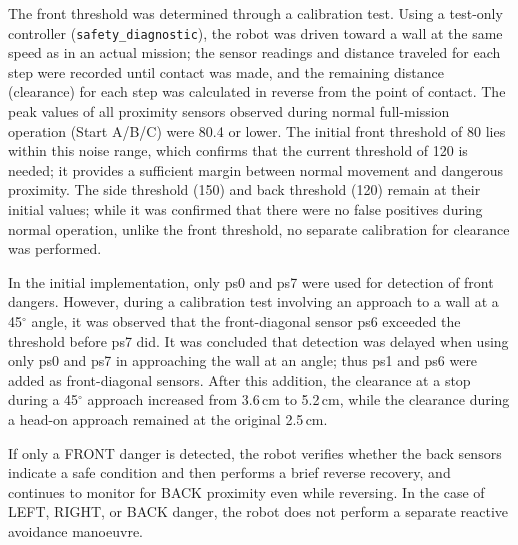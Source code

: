 The front threshold was determined through a calibration test. 
Using a test-only controller (\texttt{safety\_diagnostic}), the robot was driven toward a wall at the same speed as in an actual mission; the sensor readings and distance traveled for each step were recorded until contact was made, and the remaining distance (clearance) for each step was calculated in reverse from the point of contact.
The peak values of all proximity sensors observed during normal full-mission operation (Start A/B/C) were 80.4 or lower. 
The initial front threshold of 80 lies within this noise range, which confirms that the current threshold of 120 is needed; it provides a sufficient margin between normal movement and dangerous proximity. 
The side threshold (150) and back threshold (120) remain at their initial values; while it was confirmed that there were no false positives during normal operation, unlike the front threshold, no separate calibration for clearance was performed. 

In the initial implementation, only ps0 and ps7 were used for detection of front dangers. However, during a calibration test involving an approach to a wall at a 45$^\circ$ angle, it was observed that the front-diagonal sensor ps6 exceeded the threshold before ps7 did. 
It was concluded that detection was delayed when using only ps0 and ps7 in approaching the wall at an angle; thus ps1 and ps6 were added as front-diagonal sensors. 
After this addition, the clearance at a stop during a 45$^\circ$ approach increased from 3.6\,cm to 5.2\,cm, while the clearance during a head-on approach remained at the original 2.5\,cm. 

If only a FRONT danger is detected, the robot verifies whether the back sensors indicate a safe condition and then performs a brief reverse recovery, and continues to monitor for BACK proximity even while reversing. 
In the case of LEFT, RIGHT, or BACK danger, the robot does not perform a separate reactive avoidance manoeuvre. 

